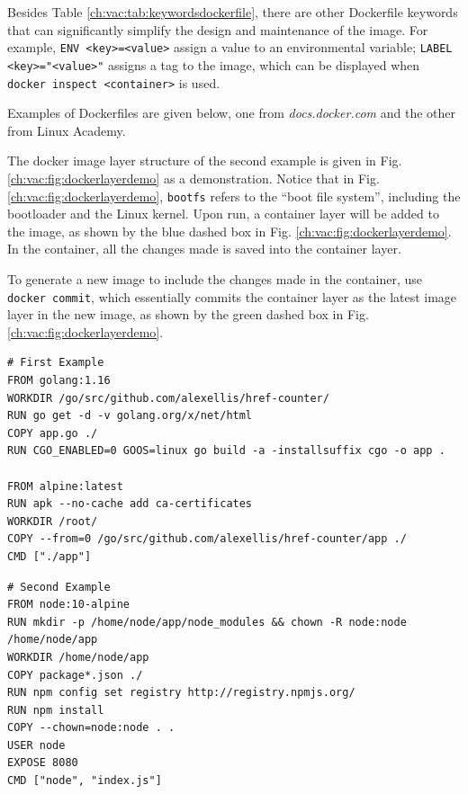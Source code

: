 Besides Table \ref{ch:vac:tab:keywordsdockerfile}, there are other Dockerfile keywords that can significantly simplify the design and maintenance of the image. For example, \verb|ENV <key>=<value>| assign a value to an environmental variable; \verb|LABEL <key>="<value>"| assigns a tag to the image, which can be displayed when \verb|docker inspect <container>| is used.

Examples of Dockerfiles are given below, one from \textit{docs.docker.com} and the other from Linux Academy.

The docker image layer structure of the second example is given in Fig. \ref{ch:vac:fig:dockerlayerdemo} as a demonstration. Notice that in Fig. \ref{ch:vac:fig:dockerlayerdemo}, \verb|bootfs| refers to the ``boot file system'', including the bootloader and the Linux kernel. Upon run, a container layer will be added to the image, as shown by the blue dashed box in Fig. \ref{ch:vac:fig:dockerlayerdemo}. In the container, all the changes made is saved into the container layer.

To generate a new image to include the changes made in the container, use \verb|docker commit|, which essentially commits the container layer as the latest image layer in the new image, as shown by the green dashed box in Fig. \ref{ch:vac:fig:dockerlayerdemo}.

\begin{lstlisting}
# First Example
FROM golang:1.16
WORKDIR /go/src/github.com/alexellis/href-counter/
RUN go get -d -v golang.org/x/net/html
COPY app.go ./
RUN CGO_ENABLED=0 GOOS=linux go build -a -installsuffix cgo -o app .

FROM alpine:latest
RUN apk --no-cache add ca-certificates
WORKDIR /root/
COPY --from=0 /go/src/github.com/alexellis/href-counter/app ./
CMD ["./app"]
\end{lstlisting}

\begin{lstlisting}
# Second Example
FROM node:10-alpine
RUN mkdir -p /home/node/app/node_modules && chown -R node:node /home/node/app
WORKDIR /home/node/app
COPY package*.json ./
RUN npm config set registry http://registry.npmjs.org/
RUN npm install
COPY --chown=node:node . .
USER node
EXPOSE 8080
CMD ["node", "index.js"]
\end{lstlisting}

